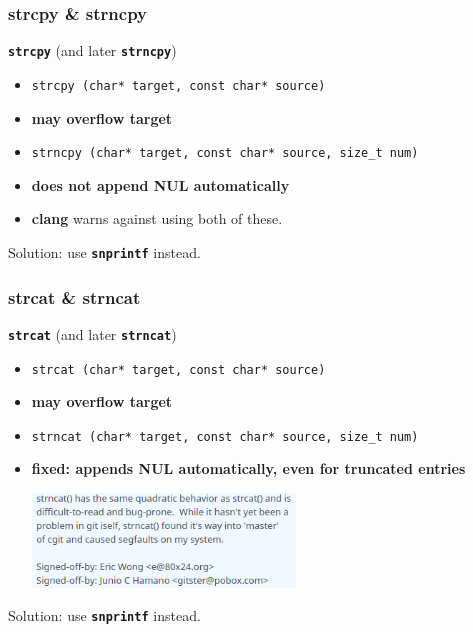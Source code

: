\documentclass[aspectratio=169]{beamer}
\begin{document}
\begin{frame}
\frametitle{strcpy \& strncpy}
{\huge \texttt{\textbf{strcpy}} (and later \texttt{\textbf{strncpy}})}\par
\vspace{4ex}
\begin{itemize}
\item <1->\texttt{strcpy (char* target, const char* source)}
\item <2->\textbf{\textcolor{clRedFlag}{may overflow target}}
\item <3->\texttt{strncpy (char* target, const char* source, size\_t num)}
\item <4->\textbf{\textcolor{clRedFlag}{does not append NUL automatically}}
\item <4->\textbf{clang} warns against using both of these.
\end{itemize}

\vspace{2ex}
{\large Solution: \textcolor{clGreen}{use \texttt{\textbf{snprintf}} instead.}}
\end{frame}


\begin{frame}
\frametitle{strcat \& strncat}
{\huge \texttt{\textbf{strcat}} (and later \texttt{\textbf{strncat}})}\par
\vspace{4ex}
\begin{itemize}
\item <1->\texttt{strcat (char* target, const char* source)}
\item <2->\textbf{\textcolor{clRedFlag}{may overflow target}}
\item <3->\texttt{strncat (char* target, const char* source, size\_t num)}
\item <4->\textbf{\textcolor{clGreen}{fixed: appends NUL automatically, even for truncated entries}}\par
\includegraphics[width=7cm]{pics/strncat_bad.png}
\end{itemize}

\vspace{2ex}
{\large Solution: \textcolor{clGreen}{use \texttt{\textbf{snprintf}} instead.}}
\end{frame}
\end{document}
